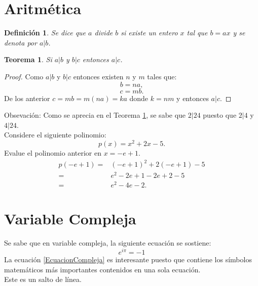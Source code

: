 \documentclass[12pt,letterpaper]{article}
\newtheorem{Def}{Definición}[section]
\newtheorem{Teo}{Teorema}[section]
\newcommand{\sangria}{\hspace*{0.5cm}}
\begin{document}
\section{Aritmética}
\begin{Def}
Se dice que $a$ divide $b$ si existe un entero $x$ tal que $b=ax$ y se denota por $a|b$.
\end{Def}
\begin{Teo}
\label{Referencia_Division}
Si $a|b$ y $b|c$ entonces $a|c$.
\end{Teo}
\begin{proof}
Como $a|b$ y $b|c$ entonces existen $n$ y $m$ tales que:
$$b=na,$$ 
$$c=mb.$$
De los anterior $c=mb=m(na)=ka$ donde $k=nm$ y entonces $a|c$.
\end{proof}
Obsevación: Como se aprecia en el Teorema \ref{Referencia_Division}, se sabe que $2|24$ puesto que $2|4$ y $4|24$.\\
Considere el siguiente polinomio:
$$p(x)=x^2+2x-5.$$
Evalue el polinomio anterior en $x=-e+1$.
\begin{align*}
p(-e+1)=&(-e+1)^2+2(-e+1)-5\\
=&e^2-2e+1-2e+2-5\\
=&e^2-4e-2.
\end{align*}
\section{Variable Compleja}
Se sabe que en variable compleja, la siguiente ecuación se sostiene:
\begin{equation}
\label{EcuacionCompleja}
e^{i\pi}=-1
\end{equation}
\sangria La ecuación \eqref{EcuacionCompleja} es interesante puesto que contiene los símbolos matemáticos más importantes contenidos en una sola ecuación.\\[1cm]
Este es un salto de línea.
\end{document}

